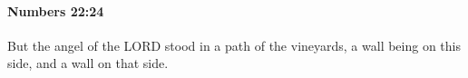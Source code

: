 
		\paragraph{Numbers 22:24} %
			\label{NUMBERS-22-24}

			But the angel of the LORD stood in a path of the vineyards, a wall being on this side, and a wall on that side.


